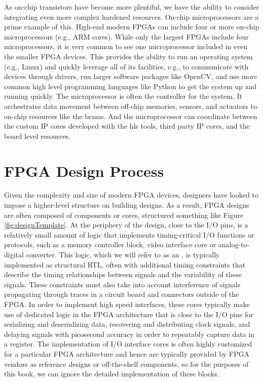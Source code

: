 As on-chip transistors have become more plentiful, we have the ability to consider integrating even more complex hardened resources. On-chip microprocessors are a prime example of this. High-end modern FPGAs can include four or more on-chip microprocessors (e.g., ARM cores). While only the largest FPGAs include four microprocessors, it is very common to see one microprocessor included in even the smaller FPGA devices. This provides the ability to run an operating system (e.g., Linux) and quickly leverage all of its facilities, e.g., to communicate with devices through drivers, run larger software packages like OpenCV, and use more common high level programming languages like Python to get the system up and running quickly. The microprocessor is often the controller for the system. It orchestrates data movement between off-chip memories, sensors, and actuators  to on-chip resources like the \glspl{bram}. And the microprocessor can coordinate between the custom IP cores developed with the \gls{hls} tools, third party IP cores, and the board level resources.   

\section{FPGA Design Process}

Given the complexity and size of modern FPGA devices, designers have looked to impose a higher-level structure on building designs.  As a result, FPGA designs are often composed of components or \glspl{core}, structured something like Figure \ref{fig:designTemplate}.  At the periphery of the design, close to the I/O pins, is a relatively small amount of logic that implements timing-critical I/O functions or protocols, such as a memory controller block, video interface core or analog-to-digital converter.  This logic, which we will refer to as an , is typically implemented as structural RTL, often with additional timing constraints that describe the timing relationships between signals and the variability of these signals.   These constraints must also take into account interference of signals propagating through traces in a circuit board and connectors outside of the FPGA.  In order to implement high speed interfaces, these cores typically make use of dedicated logic in the FPGA architecture that is close to the I/O pins for serializing and deserializing data, recovering and distributing clock signals, and delaying signals with picosecond accuracy in order to repeatably capture data in a register.  The implementation of I/O interface cores is often highly customized for a particular FPGA architecture and hence are typically provided by FPGA vendors as reference designs or off-the-shelf components, so for the purposes of this book, we can ignore the detailed implementation of these blocks.

